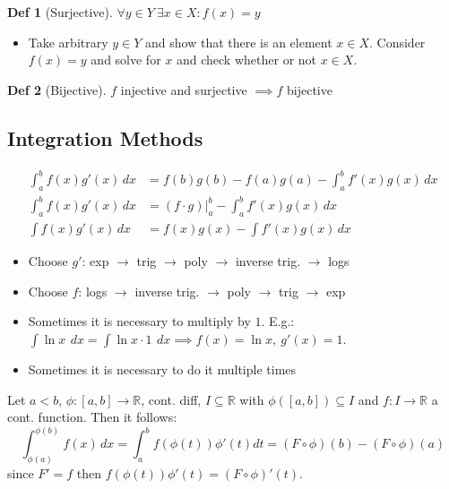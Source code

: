 \documentclass[a4paper, 10pt]{article}
\theoremstyle{definition}
\newtheorem*{definition}{Def}
\newcommand{\R}{\mathbb{R}}
\begin{document}
\begin{definition}[Surjective]
    $\forall y \in Y \ \exists x \in X: f(x) = y$
    \begin{itemize}
        \item Take arbitrary $y \in Y$ and show that there is an element $x \in X$. Consider $f(x) = y$ and solve for $x$ and check whether or not $x \in X$.
    \end{itemize}
\end{definition}

\begin{definition}[Bijective]
    $f$ injective and surjective $\implies f$ bijective
\end{definition}

\subsection*{Integration Methods}
\begin{ntheorem*}
    \begin{align*}
        \int_a^b f(x) g'(x) \,dx &= f(b)g(b) - f(a)g(a) - \int_a^b f'(x)g(x) \,dx \\
        \int_a^b f(x) g'(x) \,dx &= (f \cdot g)|_a^b - \int_a^b f'(x)g(x) \,dx \\
        \int f(x)g'(x) \,dx &= f(x) g(x) - \int f'(x) g(x) \,dx
    \end{align*}
\end{ntheorem*}
\begin{itemize}
    \item Choose $g'$: exp $\rightarrow$ trig $\rightarrow$ poly $\rightarrow$ inverse trig. $\rightarrow$ logs
    \item Choose $f$: logs $\rightarrow$ inverse trig. $\rightarrow$ poly $\rightarrow$ trig $\rightarrow$ exp
    \item Sometimes it is necessary to multiply by $1$. E.g.: $\int \ln x \ \,dx = \int \ln x \cdot 1 \ \,dx \implies f(x) = \ln x, \ g'(x) = 1$.
    \item Sometimes it is necessary to do it multiple times
\end{itemize}

\begin{ntheorem*}[Substitution]
    Let $a < b$, $\phi: [a, b] \to \R$, cont. diff, $I \subseteq \R$ with $\phi([a, b]) \subseteq I$ and $f: I \to \R$ a cont. function. Then it follows:
    $$\int_{\phi(a)}^{\phi(b)} f(x) \,dx = \int_a^b f(\phi(t)) \phi'(t) dt = (F \circ \phi)(b) - (F \circ \phi)(a)$$
    since $F'=f$ then $f(\phi(t))\phi'(t) = (F \circ \phi)'(t)$.
\end{ntheorem*}
\end{document}
